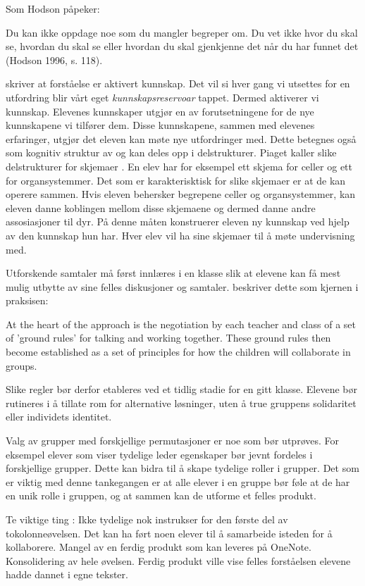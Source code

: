 \documentclass[main.tex]{subfiles}
\begin{document}
\begin{displayquote}
\guillemotleft Som Hodson påpeker:
\begin{displayquote}
Du kan ikke oppdage noe som du mangler begreper om. Du vet ikke hvor du skal se, hvordan du skal se 
eller hvordan du skal gjenkjenne det når du har funnet det (Hodson 1996, s. 118). \guillemotright
\end{displayquote}
\end{displayquote}
 skriver at forståelse er aktivert kunnskap. Det vil si hver gang vi utsettes 
for en utfordring blir vårt eget \emph{kunnskapsreservoar} tappet. Dermed aktiverer vi kunnskap. 
Elevenes kunnskaper utgjør en av forutsetningene for de nye kunnskapene vi tilfører dem. Disse 
kunnskapene, sammen med elevenes erfaringer, utgjør det eleven kan møte nye utfordringer med. Dette 
betegnes også som kognitiv struktur av \citeauthor{solv92} og kan deles opp i delstrukturer. Piaget 
kaller slike delstrukturer for skjemaer . En elev har for eksempel ett skjema 
for celler og ett for organsystemmer. Det som er karakterisktisk for slike skjemaer er at de kan 
operere sammen. Hvis eleven behersker begrepene celler og organsystemmer, kan eleven danne koblingen
mellom disse skjemaene og dermed danne andre assosiasjoner til dyr. På denne måten konstruerer 
eleven ny kunnskap ved hjelp av den kunnskap hun har. Hver elev vil ha sine skjemaer til å møte 
undervisning med.

Utforskende samtaler må først innlæres i en klasse slik at elevene kan få mest mulig
utbytte av sine felles diskusjoner og samtaler.  beskriver dette som kjernen i 
praksisen:
\begin{displayquote}
\guillemotleft
At the heart of the approach is the negotiation by each teacher and class of a set of 'ground
rules' for talking and working together. These ground rules then become established as a set of 
principles for how the children will collaborate in groups.
\guillemotright
\end{displayquote}
Slike regler bør derfor etableres ved et tidlig stadie for en gitt klasse. Elevene bør rutineres
i å tillate rom for alternative løsninger, uten å true gruppens solidaritet eller individets 
identitet. 

Valg av grupper med forskjellige permutasjoner er noe som bør utprøves. For eksempel elever
som viser tydelige leder egenskaper bør jevnt fordeles i forskjellige grupper. Dette kan bidra til
å skape tydelige roller i grupper. Det som er viktig med denne tankegangen er at alle elever
i en gruppe bør føle at de har en unik rolle i gruppen, og at sammen kan de utforme et felles
produkt.

Te viktige ting : Ikke tydelige nok instrukser for den første del av tokolonneøvelsen. 
Det kan ha ført noen elever til å samarbeide isteden for å kollaborere.
Mangel av en ferdig produkt som kan leveres på OneNote. Konsolidering av 
hele øvelsen. Ferdig produkt ville vise felles forståelsen elevene hadde dannet i egne
tekster.
\end{document}
